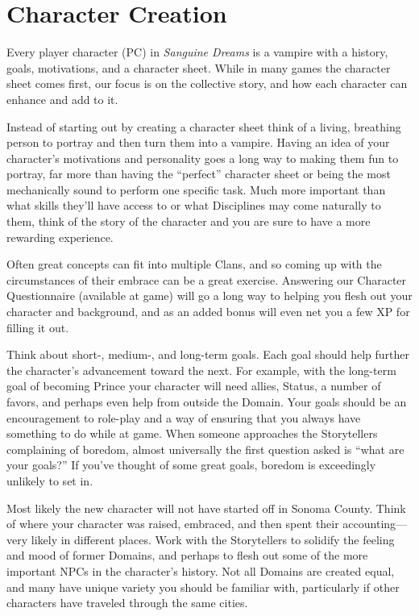 \section{Character Creation}
\label{sec:creation}
Every player character (PC) in \emph{Sanguine Dreams} is a vampire with a history, goals, 
motivations, and a character sheet.  While in many games the character sheet comes first, 
our focus is on the collective story, and how each character can enhance and add to it.

Instead of starting out by creating a character sheet think of a living, breathing 
person to portray and then turn them into a vampire.  Having an idea of your character's 
motivations and personality goes a long way to making them fun to portray, far more 
than having the ``perfect'' character sheet or being the most mechanically sound to 
perform one specific task.  Much more important than what skills they'll have access to 
or what Disciplines may come naturally to them, think of the story of the character and 
you are sure to have a more rewarding experience.

Often great concepts can fit into multiple Clans, and so coming up with the circumstances 
of their embrace can be a great exercise.  Answering our Character Questionnaire 
(available at game) will go a long way to helping you flesh out your character and 
background, and as an added bonus will even net you a few XP for filling it out.  

Think about short-, medium-, and long-term goals.  Each goal should help further 
the character's advancement toward the next.  For example, with the long-term goal of 
becoming Prince your character will need allies, Status, a number of favors, and perhaps 
even help from outside the Domain.  Your goals should be an encouragement to role-play 
and a way of ensuring that you always have something to do while at game.  When someone 
approaches the Storytellers complaining of boredom, almost universally the first question 
asked is ``what are your goals?''  If you've thought of some great goals, boredom is 
exceedingly unlikely to set in.

Most likely the new character will not have started off in Sonoma County.  Think of where 
your character was raised, embraced, and then spent their accounting---very likely in 
different places.  Work with the Storytellers to solidify the feeling and mood of former 
Domains, and perhaps to flesh out some of the more important NPCs in the character's 
history.  Not all Domains are created equal, and many have unique variety you should be 
familiar with, particularly if other characters have traveled through the same cities.

